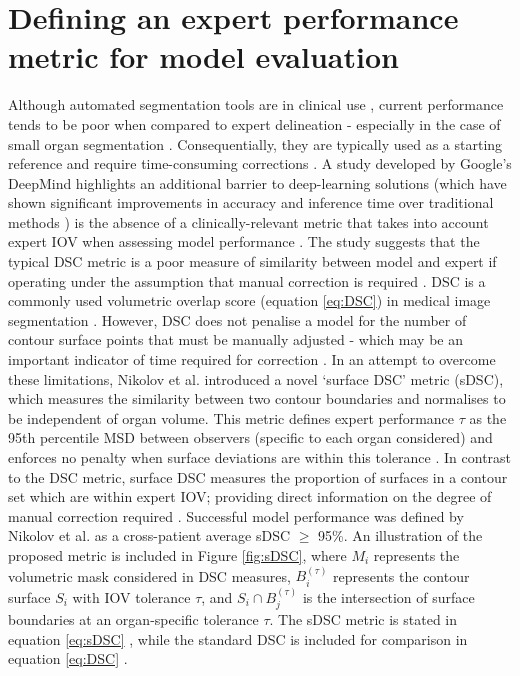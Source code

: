 \section{Defining an expert performance metric for model evaluation}
Although automated segmentation tools are in clinical use \cite{Zhu_2018}, current performance tends to be poor when compared to expert delineation - especially in the case of small organ segmentation \cite{Nikolov_2018, Zhu_2018}. Consequentially, they are typically used as a starting reference and require time-consuming corrections \cite{Nikolov_2018, Nemoto_2020}. A study developed by Google's DeepMind highlights an additional barrier to deep-learning solutions (which have shown significant improvements in accuracy and inference time over traditional methods \cite{Zhu_2018}) is the absence of a clinically-relevant metric that takes into account expert IOV when assessing model performance \cite{Nikolov_2018}. The study suggests that the typical DSC metric is a poor measure of similarity between model and expert if operating under the assumption that manual correction is required \cite{Nikolov_2018}. DSC is a commonly used volumetric overlap score (equation \ref{eq:DSC}) in medical image segmentation \cite{Taha_2015}. However, DSC does not penalise a model for the number of contour surface points that must be manually adjusted \cite{Nikolov_2018} - which may be an important indicator of time required for correction \cite{Nikolov_2018}. In an attempt to overcome these limitations, Nikolov et al. introduced a novel `surface DSC' metric (sDSC), which measures the similarity between two contour boundaries and normalises to be independent of organ volume. This metric defines expert performance $\tau$ as the 95th percentile MSD between observers (specific to each organ considered) and enforces no penalty when surface deviations are within this tolerance \cite{Nikolov_2018}. In contrast to the DSC metric,  surface DSC measures the proportion of surfaces in a contour set which are within expert IOV; providing direct information on the degree of manual correction required \cite{Nikolov_2018}. Successful model performance was defined by Nikolov et al. as a cross-patient average sDSC $\geq$ 95\%. An illustration of the proposed metric is included in Figure \ref{fig:sDSC},
where $M_{i}$ represents the volumetric mask considered in DSC measures, $B_{i}^{(\tau)}$ represents the contour surface $S_{i}$ with IOV tolerance $\tau$, and $S_{i} \cap B_{j}^{(\tau)}$ is the intersection of surface boundaries at an organ-specific tolerance $\tau$. The sDSC metric is stated in equation \ref{eq:sDSC} \cite{Nemoto_2020}, while the standard DSC is included for comparison in equation \ref{eq:DSC} \cite{Bertels2019}.

